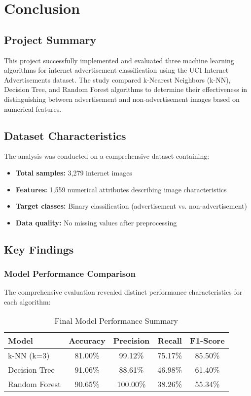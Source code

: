 \section{Conclusion}
\label{sec:conclusion}

\subsection{Project Summary}

This project successfully implemented and evaluated three machine learning algorithms for internet advertisement classification using the UCI Internet Advertisements dataset. The study compared k-Nearest Neighbors (k-NN), Decision Tree, and Random Forest algorithms to determine their effectiveness in distinguishing between advertisement and non-advertisement images based on numerical features.

\subsection{Dataset Characteristics}

The analysis was conducted on a comprehensive dataset containing:
\begin{itemize}
    \item \textbf{Total samples:} 3,279 internet images
    \item \textbf{Features:} 1,559 numerical attributes describing image characteristics
    \item \textbf{Target classes:} Binary classification (advertisement vs. non-advertisement)
    \item \textbf{Data quality:} No missing values after preprocessing
\end{itemize}

\subsection{Key Findings}

\subsubsection{Model Performance Comparison}

The comprehensive evaluation revealed distinct performance characteristics for each algorithm:

\begin{table}[h]
\centering
\caption{Final Model Performance Summary}
\label{tab:final_performance}
\begin{tabular}{|l|c|c|c|c|}
\hline
\textbf{Model} & \textbf{Accuracy} & \textbf{Precision} & \textbf{Recall} & \textbf{F1-Score} \\
\hline
k-NN (k=3) & 81.00\% & 99.12\% & 75.17\% & 85.50\% \\
Decision Tree & 91.06\% & 88.61\% & 46.98\% & 61.40\% \\
Random Forest & 90.65\% & 100.00\% & 38.26\% & 55.34\% \\
\hline
\end{tabular}
\end{table}

